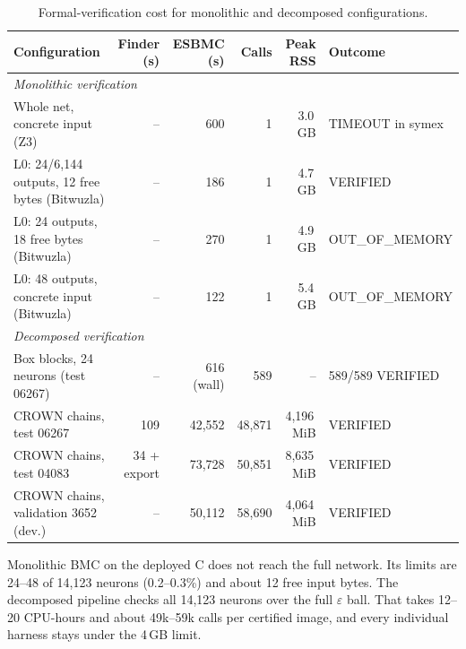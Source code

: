 \begin{table}[t]
\centering
\caption{Formal-verification cost for monolithic and decomposed configurations.}
\label{tab:cost}
\scriptsize
\renewcommand{\arraystretch}{1.15}
\setlength{\tabcolsep}{7pt}

\begin{tabular}{lrrrrl}
\toprule
\textbf{Configuration}
& \textbf{Finder (s)}
& \textbf{ESBMC (s)}
& \textbf{Calls}
& \textbf{Peak RSS}
& \textbf{Outcome} \\
\midrule

\multicolumn{6}{l}{\textit{Monolithic verification}} \\
\addlinespace[1pt]

Whole net, concrete input (Z3)
& -- & 600 & 1 & 3.0\,GB
& TIMEOUT in symex \\

L0: 24/6,144 outputs, 12 free bytes (Bitwuzla)
& -- & 186 & 1 & 4.7\,GB
& VERIFIED \\

L0: 24 outputs, 18 free bytes (Bitwuzla)
& -- & 270 & 1 & 4.9\,GB
& OUT\_OF\_MEMORY \\

L0: 48 outputs, concrete input (Bitwuzla)
& -- & 122 & 1 & 5.4\,GB
& OUT\_OF\_MEMORY \\

\midrule

\multicolumn{6}{l}{\textit{Decomposed verification}} \\
\addlinespace[1pt]

Box blocks, 24 neurons (test 06267)
& -- & 616 (wall) & 589 & --
& 589/589 VERIFIED \\

CROWN chains, test 06267
& 109 & 42,552 & 48,871 & 4,196\,MiB
& VERIFIED \\

CROWN chains, test 04083
& 34 + export & 73,728 & 50,851 & 8,635\,MiB
& VERIFIED \\

CROWN chains, validation 3652 (dev.)
& -- & 50,112 & 58,690 & 4,064\,MiB
& VERIFIED \\

\bottomrule
\end{tabular}


\end{table}

Monolithic BMC on the deployed C does not reach the full network. Its limits are 24--48 of 14,123 neurons (0.2--0.3\%) and about 12 free input bytes. The decomposed pipeline checks all 14,123 neurons over the full $\varepsilon$ ball. That takes 12--20 CPU-hours and about 49k--59k calls per certified image, and every individual harness stays under the 4\,GB limit.

